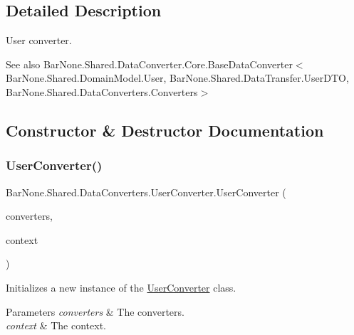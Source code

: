 \subsection{Detailed Description}
User converter. 

\begin{DoxySeeAlso}{See also}
Bar\+None.\+Shared.\+Data\+Converter.\+Core.\+Base\+Data\+Converter$<$\+Bar\+None.\+Shared.\+Domain\+Model.\+User, Bar\+None.\+Shared.\+Data\+Transfer.\+User\+D\+T\+O, Bar\+None.\+Shared.\+Data\+Converters.\+Converters$>$


\end{DoxySeeAlso}


\subsection{Constructor \& Destructor Documentation}
\mbox{\label{class_bar_none_1_1_shared_1_1_data_converters_1_1_user_converter_a385883407cacbab2b835fc9c41d911bc}} 
\subsubsection{\texorpdfstring{User\+Converter()}{UserConverter()}}
{\footnotesize\ttfamily Bar\+None.\+Shared.\+Data\+Converters.\+User\+Converter.\+User\+Converter (\begin{DoxyParamCaption}\item[{\mbox{\hyperlink{class_bar_none_1_1_shared_1_1_data_converters_1_1_converters}{Converters}}}]{converters,  }\item[{\mbox{\hyperlink{interface_bar_none_1_1_shared_1_1_core_1_1_i_domain_context}{I\+Domain\+Context}}}]{context }\end{DoxyParamCaption})}



Initializes a new instance of the \mbox{\hyperlink{class_bar_none_1_1_shared_1_1_data_converters_1_1_user_converter}{User\+Converter}} class. 


\begin{DoxyParams}{Parameters}
{\em converters} & The converters.\\
\hline
{\em context} & The context.\\
\hline
\end{DoxyParams}


